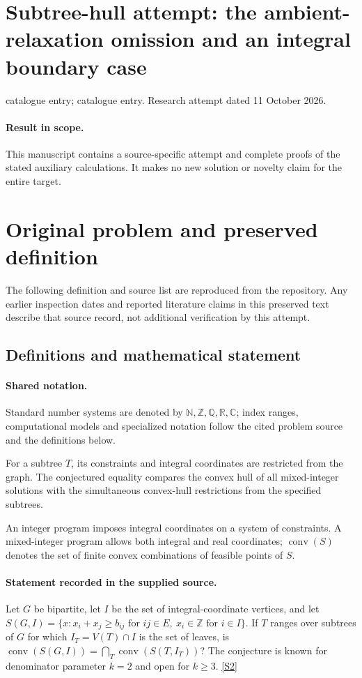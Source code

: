 \documentclass[11pt]{article}
\begin{document}
\section*{Subtree-hull attempt: the ambient-relaxation omission and an integral boundary case}
\noindent catalogue entry; catalogue entry. Research attempt dated 11 October 2026.
\paragraph{Result in scope.}This manuscript contains a source-specific attempt and complete proofs of the stated auxiliary calculations. It makes no new solution or novelty claim for the entire target.
\section{Original problem and preserved definition}
The following definition and source list are reproduced from the repository. Any earlier inspection dates and reported literature claims in this preserved text describe that source record, not additional verification by this attempt.
\subsection{Definitions and mathematical statement}

\paragraph{Shared notation.}Standard number systems are denoted by $\mathbb N,\mathbb Z,\mathbb Q,\mathbb R,\mathbb C$; index ranges, computational models and specialized notation follow the cited problem source and the definitions below.


For a subtree $T$, its constraints and integral coordinates are restricted from the graph. The conjectured equality compares the convex hull of all mixed-integer solutions with the simultaneous convex-hull restrictions from the specified subtrees.

An integer program imposes integral coordinates on a system of constraints. A mixed-integer program allows both integral and real coordinates; $\operatorname{conv}(S)$ denotes the set of finite convex combinations of feasible points of $S$.
\paragraph{Statement recorded in the supplied source.}
Let $G$ be bipartite, let $I$ be the set of integral-coordinate vertices, and let $S(G,I)=\{x:x_i+x_j\geq b_{ij}\text{ for }ij\in E,\ x_i\in\mathbb{Z}\text{ for }i\in I\}$. If $T$ ranges over subtrees of $G$ for which $I_T=V(T)\cap I$ is the set of leaves, is $\operatorname{conv}(S(G,I))=\bigcap_T\operatorname{conv}(S(T,I_T))$? The conjecture is known for denominator parameter $k=2$ and open for $k\geq3$. \href{https://doi.org/10.4171/owr/2008/51}{[S2]}
\end{document}
